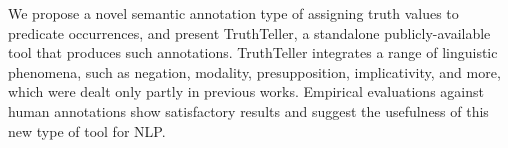 We propose a novel semantic annotation type of assigning truth values to predicate occurrences, and present TruthTeller, a standalone publicly-available
 tool that produces such annotations. 
 TruthTeller integrates a range of linguistic phenomena, such as negation,
 modality, presupposition, implicativity, and more, which were dealt only partly
 in previous works. Empirical evaluations against human annotations show
 satisfactory results and suggest the usefulness of this new type of tool for
 NLP.

